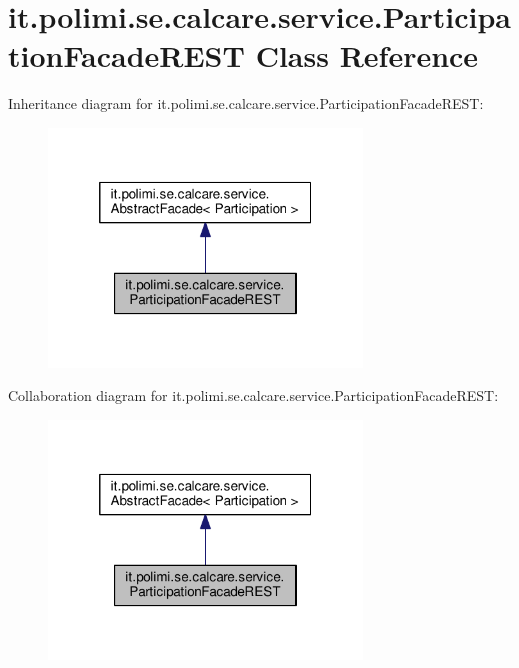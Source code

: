 \hypertarget{classit_1_1polimi_1_1se_1_1calcare_1_1service_1_1ParticipationFacadeREST}{}\section{it.\+polimi.\+se.\+calcare.\+service.\+Participation\+Facade\+R\+E\+S\+T Class Reference}
\label{classit_1_1polimi_1_1se_1_1calcare_1_1service_1_1ParticipationFacadeREST}


Inheritance diagram for it.\+polimi.\+se.\+calcare.\+service.\+Participation\+Facade\+R\+E\+S\+T\+:
\nopagebreak
\begin{figure}[H]
\begin{center}
\leavevmode
\includegraphics[width=236pt]{classit_1_1polimi_1_1se_1_1calcare_1_1service_1_1ParticipationFacadeREST__inherit__graph}
\end{center}
\end{figure}


Collaboration diagram for it.\+polimi.\+se.\+calcare.\+service.\+Participation\+Facade\+R\+E\+S\+T\+:
\nopagebreak
\begin{figure}[H]
\begin{center}
\leavevmode
\includegraphics[width=236pt]{classit_1_1polimi_1_1se_1_1calcare_1_1service_1_1ParticipationFacadeREST__coll__graph}
\end{center}
\end{figure}
